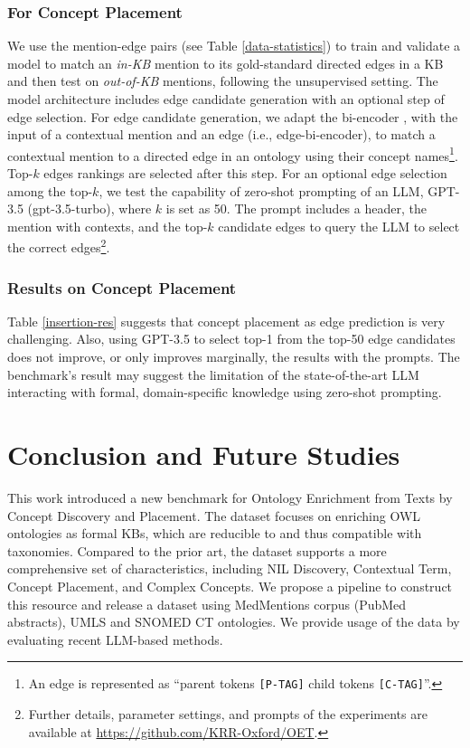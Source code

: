 \documentclass[sigconf]{acmart}
\begin{document}
\subsubsection*{For Concept Placement} We use the mention-edge pairs (see Table \ref{data-statistics}) to train and validate a model to match an \textit{in-KB} mention to its gold-standard directed edges in a KB and then test on \textit{out-of-KB} mentions, following the unsupervised setting. The model architecture includes edge candidate generation with an optional step of edge selection. For edge candidate generation, we adapt the bi-encoder  \cite{wu2020blink}, with the input of a contextual mention and an edge  (i.e., edge-bi-encoder), to match a contextual mention to a directed edge in an ontology using their concept names\footnote{An edge is represented as ``parent tokens \texttt{[P-TAG]} child tokens \texttt{[C-TAG]}''.}. Top-$k$ edges rankings are selected after this step. For an optional edge selection among the top-$k$, we test the capability of zero-shot prompting of an LLM, GPT-3.5 (gpt-3.5-turbo), where $k$ is set as 50. The prompt includes a header, the mention with contexts, and the top-$k$ candidate edges to query the LLM to select the correct edges\footnote{Further details, parameter settings, and prompts of the experiments are available at \url{https://github.com/KRR-Oxford/OET}.}.

\subsubsection*{Results on Concept Placement}
Table \ref{insertion-res} suggests that concept placement as edge prediction is very challenging. Also, using GPT-3.5 to select top-1 from the top-50 edge candidates does not improve, or only improves marginally, the results with the prompts. The benchmark's result may suggest the limitation of the state-of-the-art LLM interacting with formal, domain-specific knowledge using zero-shot prompting.

\section{Conclusion and Future Studies}
This work introduced a new benchmark for Ontology Enrichment from Texts by Concept Discovery and Placement. The dataset focuses on enriching OWL ontologies as formal KBs, which are reducible to and thus compatible with taxonomies. Compared to the prior art, the dataset supports a more comprehensive set of characteristics, including NIL Discovery, Contextual Term, Concept Placement, and Complex Concepts. We propose a pipeline to construct this resource and release a dataset using MedMentions corpus (PubMed abstracts), UMLS and SNOMED CT ontologies. We provide usage of the data by evaluating recent LLM-based methods. 
\end{document}
